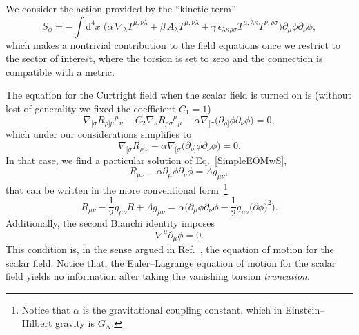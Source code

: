 \documentclass[aps,prd,12pt,twocolumn,superscriptaddress,showpacs,showkeys,reprint,longbibliography]{revtex4-1}
\newcommand\pa[1]{\partial_{{#1}}}
\renewcommand{\(}{\left(}
\renewcommand{\)}{\right)}
\renewcommand{\[}{\left[}
\renewcommand{\]}{\right]}
\newcommand{\dn}[2]{{\mathrm{d}}^{#1}{#2}\;}
\newcommand{\hl}[1]{{\color{red} \bfseries{#1}}}
\begin{document}
We consider the action provided by the ``kinetic term''
\begin{dmath}
  \label{ScalarAction}
  S_\phi = -  \int \dn{4}{x} \Big( \alpha \, \nabla_\lambda T^{\mu,\nu\lambda}  + \beta \, A_\lambda T^{\mu,\nu\lambda} + \gamma \, \epsilon_{\lambda\kappa\rho\sigma} T^{\mu, \lambda\kappa} T^{\nu, \rho\sigma} \Big) \partial_\mu\phi\partial_\nu\phi,
\end{dmath}
which makes a nontrivial contribution to the field equations once we restrict to the sector of interest, where the torsion is set to zero and the connection is compatible with a metric.

The equation for the Curtright field when the scalar field is turned on is (without lost of generality we fixed the coefficient $C_1 = 1$)
\begin{equation*}
  \nabla_{[\sigma} R_{\rho]\mu}{}^{\mu}{}_\nu - {C_2} \nabla_\nu  R_{\rho\sigma}{}^{\mu}{}_\mu - \alpha \nabla_{[\sigma} \Big( \partial_{\rho]}\phi \partial_\nu\phi \Big) = 0,
\end{equation*}
which under our considerations simplifies to 
\begin{equation}
  \nabla_{[\sigma} R_{\rho]\nu} - \alpha \nabla_{[\sigma} \Big( \partial_{\rho]}\phi \partial_\nu\phi \Big) = 0.
  \label{SimpleEOMwS}
\end{equation}
In that case, we find a particular solution of Eq.~\eqref{SimpleEOMwS},%
\begin{equation*}
  R_{\mu\nu} - \alpha \pa{\mu} \phi \pa{\nu} \phi = \Lambda g_{\mu\nu},
\end{equation*}
that can be written in the more conventional form~\footnote{Notice that $\alpha$ is the gravitational coupling constant, which in Einstein--Hilbert gravity is $G_N$.}
\begin{equation}
  R_{\mu\nu} - \frac{1}{2} g_{\mu\nu} R + \Lambda g_{\mu\nu} = \alpha \Big( \pa{\mu} \phi \pa{\nu} \phi - \frac{1}{2} g_{\mu\nu} \big( \partial\phi \big)^2 \Big).
\end{equation}
Additionally, the second Bianchi identity imposes
\begin{equation}
  \nabla^\mu \pa{\mu} \phi = 0.
\end{equation}
This condition is, in the sense argued in Ref.~\cite{Bekenstein:2014uwa}, the equation of motion for the scalar field. Notice that, the Euler--Lagrange equation of motion for the scalar field yields no information after taking the vanishing torsion \emph{truncation}.
\end{document}
